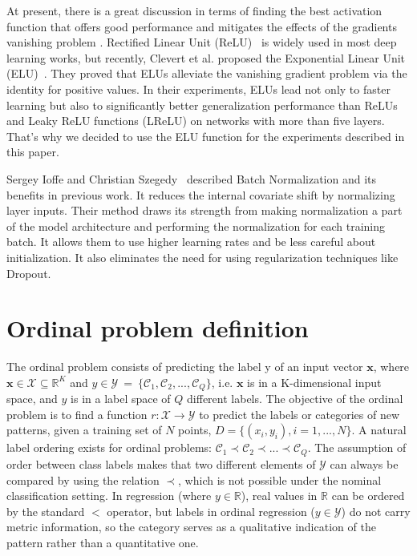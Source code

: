 \documentclass[journal]{IEEEtran}
\begin{document}
	At present, there is a great discussion in terms of finding the best activation function that offers good performance and mitigates the effects of the gradients vanishing problem \cite{bengio1994learning, pascanu2013difficulty}. Rectified Linear Unit (ReLU)~\cite{nair2010rectified} is widely used in most deep learning works, but recently, Clevert et al. proposed the Exponential Linear Unit (ELU)~\cite{clevert2015fast}. They proved that ELUs alleviate the vanishing gradient problem via the identity for positive values. In their experiments, ELUs lead not only to faster learning but also to significantly better generalization performance than ReLUs and Leaky ReLU functions (LReLU) on networks with more than five layers. That's why we decided to use the ELU function for the experiments described in this paper.
	
	Sergey Ioffe and Christian Szegedy~\cite{ioffe2015batch} described Batch Normalization and its benefits in previous work. It reduces the internal covariate shift by normalizing layer inputs. Their method draws its strength from making normalization a part of the model architecture and performing the normalization for each training batch. It allows them to use higher learning rates and be less careful about initialization. It also eliminates the need for using regularization techniques like Dropout.
	
	\section{Ordinal problem definition}
	\label{sect:ordinalproblem}
	The ordinal problem consists of predicting the label y of an input vector $\mathbf{x}$, where $\mathbf{x} \in \mathcal{X} \subseteq \mathds{R}^K$ and $y \in \mathcal{Y}~=~\{\mathcal{C}_1, \mathcal{C}_2, ..., \mathcal{C}_Q\}$, i.e. $\mathbf{x}$ is in a K-dimensional input space, and $y$ is in a label space of $Q$ different labels. The objective of the ordinal problem is to find a function $r : \mathcal{X} \rightarrow \mathcal{Y}$ to predict the labels or categories of new patterns, given a training set of $N$ points, $D = \{(x_i, y_i), i = 1, ..., N\}$. A natural label ordering exists for ordinal problems: $\mathcal{C}_1 \prec \mathcal{C}_2 \prec ... \prec \mathcal{C}_Q$. The assumption of order between class labels makes that two different elements of $\mathcal{Y}$ can always be compared by using the relation $\prec$, which is not possible under the nominal classification setting. In regression (where $y \in \mathds{R}$), real values in $\mathds{R}$ can be ordered by the standard $<$ operator, but labels in ordinal regression ($y \in \mathcal{Y}$) do not carry metric information, so the category serves as a qualitative indication of the pattern rather than a quantitative one.
	
\end{document}
